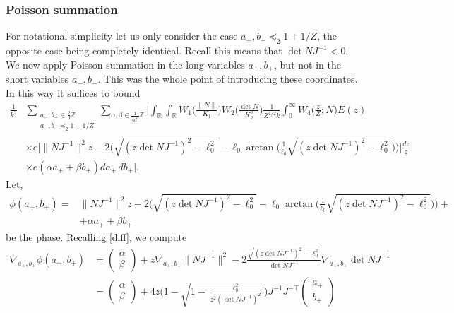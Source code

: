 \documentclass[11pt]{amsart}
\numberwithin{equation}{section}
\theoremstyle{plain}
\theoremstyle{definition}
\numberwithin{equation}{section}
\begin{document}
\subsubsection{Poisson summation} For notational simplicity let us only consider the case $a_-, b_- \preccurlyeq_{2} 1+ 1/Z$, the opposite case being completely identical. Recall this means that $\det NJ^{-1} < 0$. We now apply Poisson summation in the long variables $a_+, b_+$, but not in the short variables $a_-, b_-$. This was the whole point of introducing these coordinates. In this way it suffices to bound
\begin{align*}
\frac{1}{k^2}&  \sum_{\substack{ a_{-}, b_{-}\in \frac{2}{d}\mathbb{Z}\\ a_-, b_- \preccurlyeq_{2} 1+ 1/Z }} \sum_{\alpha, \beta \in \frac{1}{4d^4} \mathbb{Z}} \Big|\int_{\mathbb{R}}  \int_{\mathbb{R}} W_1\Big(\frac{\| N \|}{K_1}\Big) W_2\Big(\frac{\det N}{K_2^2}\Big)     \frac{1}{Z^{1/2} k} \int_0^{\infty} W_4\Big(\frac{z}{Z};N\Big) E(z) \\
 &\times e\Big[\| N J^{-1} \|^2z - 2 \Big(\sqrt{(z \det NJ^{-1})^2 - \ell_0^2}  -  \ell_0 \arctan\Big(\frac{1}{\ell_0}\sqrt{ (z\det NJ^{-1} )^2 - \ell_0^2}\Big) \Big) \Big]\frac{dz}{z} \\
 & \times e(\alpha  a_+ + \beta b_+) da_+\, db_+\Big|.
 \end{align*}
 Let,
\begin{align*}
\phi(a_+, b_+) 
=  &\| N J^{-1} \|^2z - 2 \Big(\sqrt{(z \det NJ^{-1})^2 - \ell_0^2}  -  \ell_0 \arctan\Big(\frac{1}{\ell_0}\sqrt{ (z\det NJ^{-1} )^2 - \ell_0^2}\Big) \Big) + \\
&+ \alpha  a_+ + \beta b_+
\end{align*}
be the phase. Recalling \eqref{diff},  we compute
\begin{align*}
\nabla_{a_+, b_+} \phi(a_+, b_+)&  = \left(\begin{matrix}\alpha\\ \beta\end{matrix}\right)   + z  \nabla_{a_+, b_+} \| N J^{-1} \|^2 - 2 \frac{\sqrt{(z \det NJ^{-1})^2 - \ell_0^2}}{\det NJ^{-1}}  \nabla_{a_+, b_+} \det NJ^{-1}\\
&= \left(\begin{matrix}\alpha\\ \beta\end{matrix}\right)  + 4z  \Big (1 -   \sqrt{ 1 - \frac{\ell_0^2}{z^2 (\det NJ^{-1})^2 }}    \Big)J^{-1} J^{-\top}  \left(\begin{matrix} a_+\\ b_+ \end{matrix}\right) \\
\end{align*}
\end{document}
